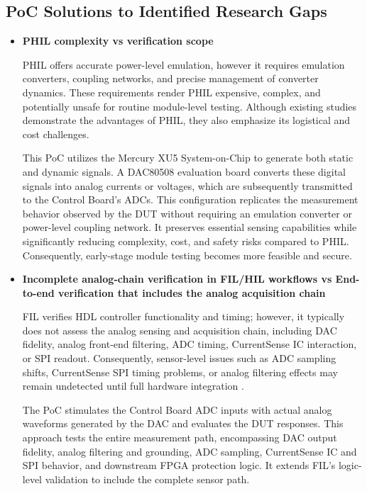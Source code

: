 \subsection{\acs{PoC} Solutions to Identified Research Gaps}

\begin{itemize}
	\item \textbf{PHIL complexity vs verification scope}
	
	PHIL offers accurate power-level emulation, however it requires emulation converters, coupling networks, and precise management of converter dynamics. These requirements render PHIL expensive, complex, and potentially unsafe for routine module-level testing. Although existing studies demonstrate the advantages of PHIL, they also emphasize its logistical and cost challenges. \cite{Schmitt2014_LiteratureSurvey}
	
	This \acs{PoC} utilizes the Mercury XU5 System-on-Chip to generate both static and dynamic signals. A DAC80508 evaluation board converts these digital signals into analog currents or voltages, which are subsequently transmitted to the Control Board’s \acs{ADC}s. This configuration replicates the measurement behavior observed by the \acs{DUT} without requiring an emulation converter or power-level coupling network. It preserves essential sensing capabilities while significantly reducing complexity, cost, and safety risks compared to PHIL. Consequently, early-stage module testing becomes more feasible and secure.
	
	\item \textbf{Incomplete analog-chain verification in \acs{FIL}/\acs{HIL} workflows vs End-to-end verification that includes the analog acquisition chain}
	
	\acs{FIL} verifies HDL controller functionality and timing; however, it typically does not assess the analog sensing and acquisition chain, including \acs{DAC} fidelity, analog front-end filtering, \acs{ADC} timing, CurrentSense IC interaction, or \acs{SPI} readout. Consequently, sensor-level issues such as \acs{ADC} sampling shifts, CurrentSense \acs{SPI} timing problems, or analog filtering effects may remain undetected until full hardware integration \cite{HDL_motorController_LiteratureSurvey}.
	
	The \acs{PoC} stimulates the Control Board \acs{ADC} inputs with actual analog waveforms generated by the \acs{DAC} and evaluates the \acs{DUT} responses. This approach tests the entire measurement path, encompassing \acs{DAC} output fidelity, analog filtering and grounding, \acs{ADC} sampling, CurrentSense IC and \acs{SPI} behavior, and downstream \acs{FPGA} protection logic. It extends \acs{FIL}’s logic-level validation to include the complete sensor path.
	

\end{itemize}
